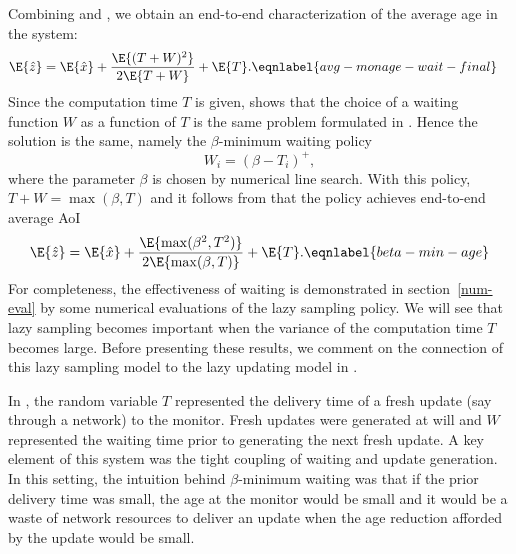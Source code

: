 \documentclass[conference, 10pt]{IEEEtran}
\newcommand{\maxage}{\hat{x}}
\newcommand{\monage}{\hat{z}}
\begin{document}
Combining  and , we obtain an end-to-end characterization of the average age in the system:
\begin{align}
        \E{\monage} &= \E{\maxage}+\frac{\E{(T+W)^2}}{2\E{T+W}} +\E{T}.  \eqnlabel{avg-monage-wait-final}
    \end{align}
Since the computation time $T$ is given,  shows that the choice of a waiting function $W$ as a function of $T$ is the same problem formulated in \cite{Sun-UBYKS-IT2017UpdateorWait,Yates-isit2015}. Hence the solution is the same, namely the $\beta$-minimum waiting policy 
\begin{equation}
    W_i = (\beta - T_i)^+,
\end{equation}
where the parameter $\beta$ is chosen by numerical line search. 
With this policy, $T+W=\max(\beta,T)$ and it follows  from  that the policy achieves end-to-end  average AoI
\begin{equation}
        \E{\monage} = \E{\maxage} + \frac{\E{\max(\beta^2, T^2)}}{2\E{\max(\beta,T)}} + \E{T}. \eqnlabel{beta-min-age}
    \end{equation}
For completeness, the effectiveness of waiting is demonstrated in  section~\ref{num-eval} by some numerical evaluations of the lazy sampling policy. We will see that lazy sampling becomes important when the variance of the computation time $T$ becomes large.  Before presenting these results, we comment on the connection of this lazy sampling model to the lazy updating model in  \cite{Sun-UBYKS-IT2017UpdateorWait,Yates-isit2015}.

In \cite{Sun-UBYKS-IT2017UpdateorWait,Yates-isit2015}, the random variable
$T$ represented the delivery time of a fresh update (say through a network)  to the monitor. Fresh updates were generated at will and $W$ represented the waiting time prior to generating the next fresh update. A key element of this system was the tight coupling of waiting  and update generation.  In this setting, the intuition behind $\beta$-minimum waiting was that if the prior delivery time was small, the age at the monitor would be small and it would be  a waste of network resources to deliver an update when the age reduction afforded by the update would be small. 
\end{document}
